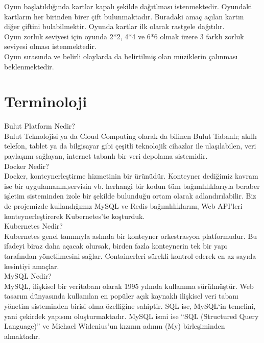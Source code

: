 \documentclass[conference]{IEEEtran}
\begin{document}
Oyun başlatıldığında kartlar kapalı şekilde dağıtlması istenmektedir. Oyundaki kartların her birinden birer çift bulunmaktadır. Buradaki amaç açılan kartın diğer çiftini bulabilmektir. Oyunda kartlar ilk olarak rastgele dağıtılır.\\

Oyun zorluk seviyesi için oyunda 2*2, 4*4 ve 6*6 olmak üzere 3 farklı zorluk seviyesi olması istenmektedir.\\

Oyun sırasında ve belirli olaylarda da belirtilmiş olan müziklerin çalınması beklenmektedir.\\

\section{Terminoloji}

Bulut Platform Nedir?\\
Bulut Teknolojisi ya da Cloud Computing olarak da bilinen Bulut Tabanlı; akıllı telefon, tablet ya da bilgisayar gibi çeşitli teknolojik cihazlar ile ulaşılabilen, veri paylaşımı sağlayan, internet tabanlı bir veri depolama sistemidir. \\

Docker Nedir?\\
Docker, konteynerleştirme hizmetinin bir ürünüdür. Konteyner dediğimiz kavram ise bir uygulamanın,servisin vb. herhangi bir kodun tüm bağımlılıklarıyla beraber işletim sisteminden izole bir şekilde bulunduğu ortam olarak adlandırılabilir. Biz de projemizde kullandığımız MySQL ve Redis bağımlılıklarını, Web API'leri konteynerleştirerek Kubernetes'te koşturduk.\\

Kubernetes Nedir?\\
Kubernetes genel tanımıyla aslında bir konteyner orkestrasyon platformudur. Bu ifadeyi biraz daha açacak olursak, birden fazla konteynerin tek bir yapı tarafından yönetilmesini sağlar. Containerleri sürekli kontrol ederek en az sayıda kesintiyi amaçlar.\\

MySQL Nedir?\\
MySQL, ilişkisel bir veritabanı olarak 1995 yılında kullanıma sürülmüştür. Web tasarım dünyasında kullanılan en popüler açık kaynaklı ilişkisel veri tabanı yönetim sisteminden birisi olma özelliğine sahiptir. SQL ise, MySQL‘in temelini, yani çekirdek yapısını oluşturmaktadır. MySQL ismi ise “SQL (Structured Query Language)” ve Michael Widenius’un kızının adının (My) birleşiminden almaktadır.\\
\end{document}
